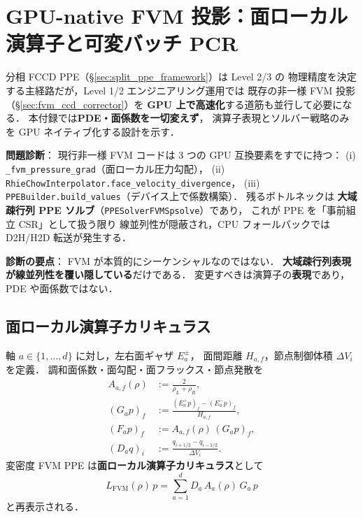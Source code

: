 %
%
\section{GPU-native FVM 投影：面ローカル演算子と可変バッチ PCR}
\label{app:gpu_fvm}

分相 FCCD PPE（\S\ref{sec:split_ppe_framework}）は Level 2/3 の
物理精度を決定する主経路だが，Level 1/2 エンジニアリング運用では
既存の非一様 FVM 投影（\S\ref{sec:fvm_ccd_corrector}）を
\textbf{GPU 上で高速化}する道筋も並行して必要になる．
本付録では\textbf{PDE・面係数を一切変えず}，
演算子表現とソルバー戦略のみを GPU ネイティブ化する設計を示す．

\noindent\textbf{問題診断}：
現行非一様 FVM コードは 3 つの GPU 互換要素をすでに持つ：
(i) \texttt{\_fvm\_pressure\_grad}（面ローカル圧力勾配），
(ii) \texttt{RhieChowInterpolator.face\_velocity\_divergence}，
(iii) \texttt{PPEBuilder.build\_values}（デバイス上で係数構築）．
残るボトルネックは
\textbf{大域疎行列 PPE ソルブ}（\texttt{PPESolverFVMSpsolve}）であり，
これが PPE を「事前組立 CSR」として扱う限り
線並列性が隠蔽され，CPU フォールバックでは D2H/H2D 転送が発生する．

\noindent\textbf{診断の要点}：
FVM が本質的にシーケンシャルなのではない．
\textbf{大域疎行列表現が線並列性を覆い隠している}だけである．
変更すべきは演算子の\textbf{表現}であり，PDE や面係数ではない．

\subsection{面ローカル演算子カリキュラス}
\label{sec:gpu_fvm_face_local_calculus}
\label{app:gpu_fvm_ops}%

軸 $a\in\{1,\ldots,d\}$ に対し，左右面ギャザ $E_a^\pm$，
面間距離 $H_{a,f}$，節点制御体積 $\Delta V_i$ を定義．
調和面係数・面勾配・面フラックス・節点発散を
\begin{align}
  A_{a,f}(\rho) &:= \frac{2}{\rho_L+\rho_R},
    \label{eq:fvm_face_harmonic}\\
  (G_a p)_f &:= \frac{(E_a^+ p)_f - (E_a^- p)_f}{H_{a,f}},
    \label{eq:fvm_face_gradient}\\
  (F_a p)_f &:= A_{a,f}(\rho)\,(G_a p)_f,
    \label{eq:fvm_face_flux}\\
  (D_a q)_i &:= \frac{q_{i+1/2}-q_{i-1/2}}{\Delta V_i}.
    \label{eq:fvm_node_divergence}
\end{align}
変密度 FVM PPE は\textbf{面ローカル演算子カリキュラス}として
\begin{equation}
  \boxed{\
    L_\text{FVM}(\rho)\,p = \sum_{a=1}^{d} D_a\,A_a(\rho)\,G_a\,p
  \ }
  \label{eq:fvm_operator_calculus}
\end{equation}
と再表示される．

